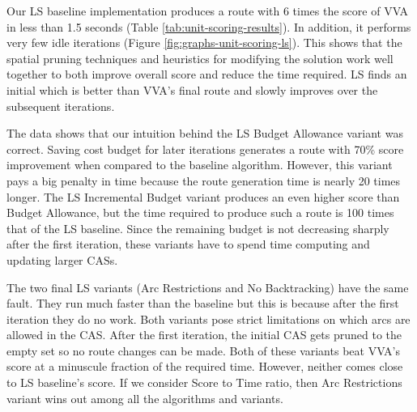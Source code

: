 \documentclass[11pt]{article}
\begin{document}
Our LS baseline implementation produces a route with 6 times the score of VVA in less than 1.5 seconds (Table \ref{tab:unit-scoring-results}). In addition, it performs very few idle iterations (Figure \ref{fig:graphs-unit-scoring-ls}). This shows that the spatial pruning techniques and heuristics for modifying the solution work well together to both improve overall score and reduce the time required. LS finds an initial which is better than VVA's final route and slowly improves over the subsequent iterations.

The data shows that our intuition behind the LS Budget Allowance variant was correct. Saving cost budget for later iterations generates a route with 70\% score improvement when compared to the baseline algorithm. However, this variant pays a big penalty in time because the route generation time is nearly 20 times longer. The LS Incremental Budget variant produces an even higher score than Budget Allowance, but the time required to produce such a route is 100 times that of the LS baseline. Since the remaining budget is not decreasing sharply after the first iteration, these variants have to spend time computing and updating larger CASs.

The two final LS variants (Arc Restrictions and No Backtracking) have the same fault. They run much faster than the baseline but this is because after the first iteration they do no work. Both variants pose strict limitations on which arcs are allowed in the CAS. After the first iteration, the initial CAS gets pruned to the empty set so no route changes can be made. Both of these variants beat VVA's score at a minuscule fraction of the required time. However, neither comes close to LS baseline's score. If we consider Score to Time ratio, then Arc Restrictions variant wins out among all the algorithms and variants.
\end{document}
